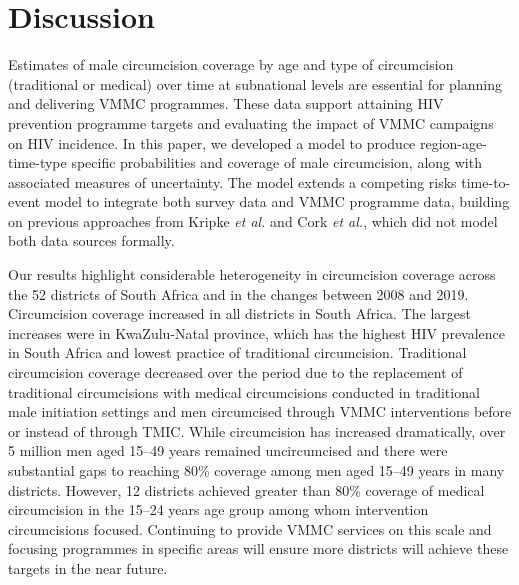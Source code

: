 \documentclass{article}
\begin{document}

\section*{Discussion}


Estimates of male circumcision coverage by age and type of circumcision (traditional or medical) over time at subnational levels are essential for planning and delivering VMMC programmes. These data support attaining HIV prevention programme targets and evaluating the impact of VMMC campaigns on HIV incidence. In this paper, we developed a model to produce region-age-time-type specific probabilities and  coverage of male circumcision, along with associated measures of uncertainty. The model extends a competing risks time-to-event model to integrate both survey data and VMMC programme data, building on previous approaches from Kripke \textit{et al.} \autocite{kripke2016cost} and Cork \textit{et al.}\autocite{cork2020mapping}, which did not model both data sources formally.

Our results highlight considerable heterogeneity in circumcision coverage across the 52 districts of South Africa and in the changes between 2008 and 2019. Circumcision coverage increased in all districts in South Africa. The largest increases were in KwaZulu-Natal province, which has the highest HIV prevalence in South Africa and lowest practice of traditional circumcision. Traditional circumcision coverage decreased over the period due to the replacement of traditional circumcisions with medical circumcisions conducted in traditional male initiation settings and men circumcised through VMMC interventions before or instead of through TMIC. While circumcision has increased dramatically, over 5 million men aged 15--49 years remained uncircumcised and there were substantial gaps to reaching 80\% coverage among men aged 15--49 years in many districts. However, 12 districts achieved greater than 80\% coverage of medical circumcision in the 15--24 years age group among whom intervention circumcisions focused. Continuing to provide VMMC services on this scale and focusing programmes in specific areas will ensure more districts will achieve these targets in the near future. 
\end{document}
